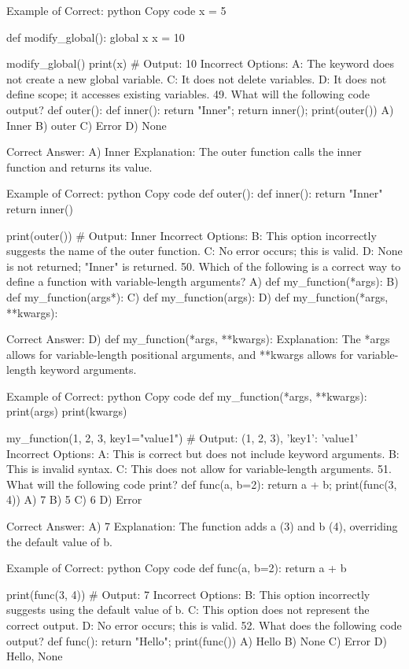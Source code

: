 Example of Correct:
python
Copy code
x = 5

def modify_global():
    global x
    x = 10

modify_global()
print(x)  # Output: 10
Incorrect Options:
A: The keyword does not create a new global variable.
C: It does not delete variables.
D: It does not define scope; it accesses existing variables.
49. What will the following code output? def outer(): def inner(): return "Inner"; return inner(); print(outer())
A) Inner
B) outer
C) Error
D) None

Correct Answer: A) Inner
Explanation: The outer function calls the inner function and returns its value.

Example of Correct:
python
Copy code
def outer():
    def inner():
        return "Inner"
    return inner()

print(outer())  # Output: Inner
Incorrect Options:
B: This option incorrectly suggests the name of the outer function.
C: No error occurs; this is valid.
D: None is not returned; "Inner" is returned.
50. Which of the following is a correct way to define a function with variable-length arguments?
A) def my_function(*args):
B) def my_function(args*):
C) def my_function(args):
D) def my_function(*args, **kwargs):

Correct Answer: D) def my_function(*args, **kwargs):
Explanation: The *args allows for variable-length positional arguments, and **kwargs allows for variable-length keyword arguments.

Example of Correct:
python
Copy code
def my_function(*args, **kwargs):
    print(args)
    print(kwargs)

my_function(1, 2, 3, key1="value1")  # Output: (1, 2, 3), {'key1': 'value1'}
Incorrect Options:
A: This is correct but does not include keyword arguments.
B: This is invalid syntax.
C: This does not allow for variable-length arguments.
51. What will the following code print? def func(a, b=2): return a + b; print(func(3, 4))
A) 7
B) 5
C) 6
D) Error

Correct Answer: A) 7
Explanation: The function adds a (3) and b (4), overriding the default value of b.

Example of Correct:
python
Copy code
def func(a, b=2):
    return a + b

print(func(3, 4))  # Output: 7
Incorrect Options:
B: This option incorrectly suggests using the default value of b.
C: This option does not represent the correct output.
D: No error occurs; this is valid.
52. What does the following code output? def func(): return "Hello"; print(func())
A) Hello
B) None
C) Error
D) Hello, None

